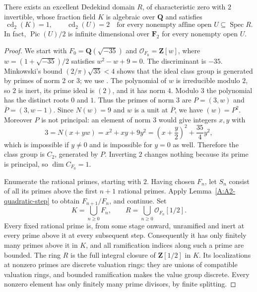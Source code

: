 \begin{theorem}
\label{A:A2-persistent-arithmetic-counterexample}
There exists an excellent Dedekind domain $R$, of characteristic
zero with $2$ invertible, whose fraction field $K$ is algebraic
over $\mathbf Q$ and satisfies
\[
 \operatorname{cd}_2(K)=1,
 \qquad
 \operatorname{cd}_2(U)=2
 \quad\text{for every nonempty affine open }U\subseteq\operatorname{Spec}R.
\]
In fact, $\operatorname{Pic}(U)/2$ is infinite dimensional over
$\mathbf F_2$ for every nonempty open $U$.
\end{theorem}
\begin{proof}
We start with $F_0=\mathbf Q(\sqrt{-35})$ and
$\mathcal O_{F_0}=\mathbf Z[w]$, where
$w=(1+\sqrt{-35})/2$ satisfies $w^2-w+9=0$.
The discriminant is $-35$. Minkowski's bound
$(2/\pi)\sqrt{35}<4$ shows that the ideal class group is
generated by primes of norm $2$ or $3$; we use
\cite[Section 4, Theorem 4.3, pp.~70--71]{C_MilneANT2020}.
The polynomial of $w$ is irreducible modulo $2$, so $2$ is
inert, its prime ideal is $(2)$, and it has norm $4$.
Modulo $3$ the polynomial has the distinct roots $0$ and $1$.
Thus the primes of norm $3$ are
$P=(3,w)$ and $\overline P=(3,w-1)$. Since $N(w)=9$ and
$w$ is a unit at $\overline P$, we have $(w)=P^2$.
Moreover $P$ is not principal: an element of norm $3$ would
give integers $x,y$ with
\[
 3=N(x+yw)=x^2+xy+9y^2
       =\left(x+\frac y2\right)^2+\frac{35}4y^2,
\]
which is impossible if $y\ne0$ and is impossible for $y=0$
as well. Therefore the class group is $C_2$, generated by
$P$. Inverting $2$ changes nothing because its prime is
principal, so $\dim C_{F_0}=1$.

Enumerate the rational primes, starting with $2$. Having chosen
$F_n$, let $S_n$ consist of all its primes above the first $n+1$
rational primes. Apply Lemma~\ref{A:A2-quadratic-step} to obtain
$F_{n+1}/F_n$, and continue. Set
\[
 K=\bigcup_{n\ge0}F_n,
 \qquad R=\bigcup_{n\ge0}\mathcal O_{F_n}[1/2].
\]
Every fixed rational prime is, from some stage onward, unramified
and inert at every prime above it at every subsequent step.
Consequently it has only finitely many primes above it in $K$,
and all ramification indices along such a prime are bounded.
The ring $R$ is the full integral closure of $\mathbf Z[1/2]$
in $K$. Its localizations at nonzero primes are discrete valuation
rings: they are unions of compatible valuation rings, and bounded
ramification makes the value group discrete. Every nonzero element
has only finitely many prime divisors, by finite splitting.


\end{proof}
